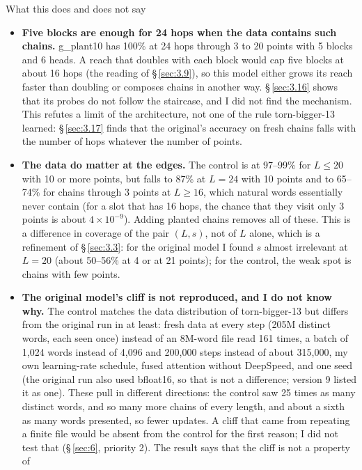 \documentclass[paper=a4,fontsize=11pt,DIV=11,parskip=half,headings=small,numbers=noendperiod]{scrartcl}
\DeclareRobustCommand{\lead}[1]{\textsf{\bfseries\color{accent}#1}}
\DeclareRobustCommand{\code}[1]{{\fontseries{m}\ttfamily #1}}
\begin{document}
\begin{findbox}{What this does and does not say}
\begin{itemize}
\item \lead{Five blocks are enough for 24 hops when the data contains such chains.}
  \code{g\_\allowbreak{}plant10} has 100\% at 24 hops through 3 to 20 points with 5 blocks and 6 heads. A reach
  that doubles with each block would cap five blocks at about 16 hops (the reading of \S\,\ref{sec:3.9}), so
  this model either grows its reach faster than doubling or composes chains in another way. \S\,\ref{sec:3.16}
  shows that its probes do not follow the staircase, and I did not find the mechanism. This refutes a limit of
  the architecture, not one of the rule \code{torn-\allowbreak{}bigger-\allowbreak{}13} learned:
  \S\,\ref{sec:3.17} finds that the original’s accuracy on fresh chains falls with the number of hops whatever
  the number of points.
\item \lead{The data do matter at the edges.} The control is at 97–99\% for $L\le20$ with 10 or more points, but
  falls to 87\% at $L=24$ with 10 points and to 65–74\% for chains through 3 points at $L\ge16$, which natural
  words essentially never contain (for a slot that has 16 hops, the chance that they visit only 3 points is
  about $4\times10^{-9}$). Adding planted chains removes all of these. This is a difference in coverage of the
  pair $(L,s)$, not of $L$ alone, which is a refinement of \S\,\ref{sec:3.3}: for the original model I found $s$
  almost irrelevant at $L=20$ (about 50–56\% at 4 or at 21 points); for the control, the weak spot is chains
  with few points.
\item \lead{The original model’s cliff is not reproduced, and I do not know why.} The control matches the data
  distribution of \code{torn-\allowbreak{}bigger-\allowbreak{}13} but differs from the original run in at least:
  fresh data at every step (205M distinct words, each seen once) instead of an 8M-word file read 161 times, a
  batch of 1,024 words instead of 4,096 and 200,000 steps instead of about 315,000, my own learning-rate
  schedule, fused attention without DeepSpeed, and one seed (the original run also used bfloat16, so that is not
  a difference; version 9 listed it as one). These pull in different directions: the control saw 25 times as
  many distinct words, and so many more chains of every length, and about a sixth as many words presented, so
  fewer updates. A cliff that came from repeating a finite file would be absent from the control for the first
  reason; I did not test that (\S\,\ref{sec:6}, priority 2). The result says that the cliff is not a property of

\end{itemize}
\end{findbox}
\end{document}
